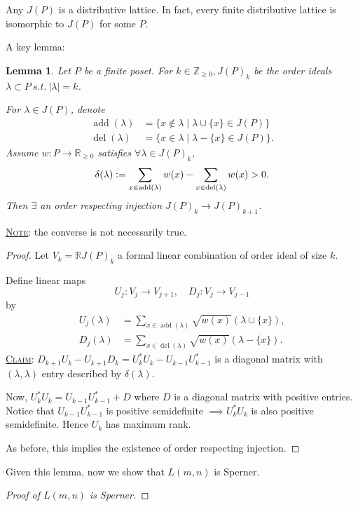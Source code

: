 \documentclass{report}
\newcommand{\R}{\mathbb{R}}
\newcommand{\Z}{\mathbb{Z}}
\newcommand{\st}{\ s.t.\ }
\def \del {\operatorname{del}}
\def \add {\operatorname{add}}
\newcommand{\defeq}{\vcentcolon=}
\newcommand{\fancyem}[1]{\underline{\textsc{#1}}}
\newtheorem{lemma}{Lemma}[section]
\theoremstyle{definition}
\theoremstyle{remark}
\numberwithin{equation}{section}
\begin{document}
Any $J(P)$ is a distributive lattice. In fact, every finite distributive lattice is isomorphic to $J(P)$ for some $P$.

A key lemma:
\begin{lemma}
    Let $P$ be a finite poset. For $k \in \Z_{\geq 0}, J(P)_k$ be the order ideals $\lambda \subset P \st |\lambda| = k$.

    For $\lambda \in J(P)$, denote \begin{align*}
        \add(\lambda) & = \{x \notin \lambda \mid \lambda \cup \{x\} \in J(P)\} \\
        \del(\lambda) & = \{x \in \lambda \mid \lambda - \{x\} \in J(P)\}.
    \end{align*}
    Assume $w: P \to \R_{\geq 0}$ satisfies $\forall \lambda \in J(P)_k$, \[
        \delta(\lambda) \defeq \sum_{x \in \add(\lambda)} w(x) - \sum_{x \in \del(\lambda)}w(x) > 0.    
    \]
    Then $\exists$ an order respecting injection $J(P)_k \to J(P)_{k+1}$.
\end{lemma}
\fancyem{Note}: the converse is not necessarily true.

\begin{proof}
    Let $V_k = \R J(P)_k$ a formal linear combination of order ideal of size $k$.

    Define linear maps \[
        U_j: V_j \to V_{j + 1}, \quad D_j: V_j \to V_{j - 1}    
    \] by \begin{align*}
        U_j(\lambda) & = \sum_{x \in \add(\lambda)} \sqrt{w(x)}\left(\lambda \cup \{x\}\right), \\
        D_j(\lambda) & = \sum_{x \in \del(\lambda)} \sqrt{w(x)}\left(\lambda - \{x\}\right).
    \end{align*}
    \fancyem{Claim}: $D_{k+1}U_k - U_{k+1}D_k = U^*_kU_k - U_{k-1}U^*_{k-1}$ is a diagonal matrix with $(\lambda, \lambda)$ entry described by $\delta(\lambda)$.

    Now, $U^*_kU_k = U_{k-1}U^*_{k-1} + D$ where $D$ is a diagonal matrix with positive entries. Notice that $U_{k-1}U^*_{k-1}$ is positive semidefinite $\implies U^*_kU_k$ is also positive semidefinite. Hence $U_k$ has maximum rank.

    As before, this implies the existence of order respecting injection.
\end{proof}

Given this lemma, now we show that $L(m, n)$ is Sperner.
\begin{proof}[Proof of $L(m, n)$ is Sperner]
    
\end{proof}
\end{document}
